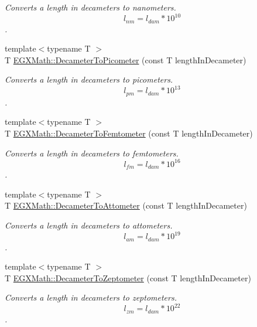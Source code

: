 \begin{DoxyCompactItemize}
\begin{DoxyCompactList}\small\item\em Converts a length in decameters to nanometers. \[ l_{nm}=l_{dam} * 10^{10} \]. \end{DoxyCompactList}\item 
{\footnotesize template$<$typename T $>$ }\\T \mbox{\hyperlink{group___e_g_x_math-_conversions-_length_conversions-_s_i-_decameter-_s_i_gab265bbced03f7b08cf4ad0db29da6dfd}{E\+G\+X\+Math\+::\+Decameter\+To\+Picometer}} (const T length\+In\+Decameter)
\begin{DoxyCompactList}\small\item\em Converts a length in decameters to picometers. \[ l_{pm}=l_{dam} * 10^{13} \]. \end{DoxyCompactList}\item 
{\footnotesize template$<$typename T $>$ }\\T \mbox{\hyperlink{group___e_g_x_math-_conversions-_length_conversions-_s_i-_decameter-_s_i_gae42b64853340c10623d206afbc6a9ff4}{E\+G\+X\+Math\+::\+Decameter\+To\+Femtometer}} (const T length\+In\+Decameter)
\begin{DoxyCompactList}\small\item\em Converts a length in decameters to femtometers. \[ l_{fm}=l_{dam} * 10^{16} \]. \end{DoxyCompactList}\item 
{\footnotesize template$<$typename T $>$ }\\T \mbox{\hyperlink{group___e_g_x_math-_conversions-_length_conversions-_s_i-_decameter-_s_i_ga580471565f6ffb83166a8b21b2a3a01e}{E\+G\+X\+Math\+::\+Decameter\+To\+Attometer}} (const T length\+In\+Decameter)
\begin{DoxyCompactList}\small\item\em Converts a length in decameters to attometers. \[ l_{am}=l_{dam} * 10^{19} \]. \end{DoxyCompactList}\item 
{\footnotesize template$<$typename T $>$ }\\T \mbox{\hyperlink{group___e_g_x_math-_conversions-_length_conversions-_s_i-_decameter-_s_i_gaa5ec7101e385d972cd3175fab39fd2c6}{E\+G\+X\+Math\+::\+Decameter\+To\+Zeptometer}} (const T length\+In\+Decameter)
\begin{DoxyCompactList}\small\item\em Converts a length in decameters to zeptometers. \[ l_{zm}=l_{dam} * 10^{22} \]. \end{DoxyCompactList}\item 

\end{DoxyCompactItemize}
